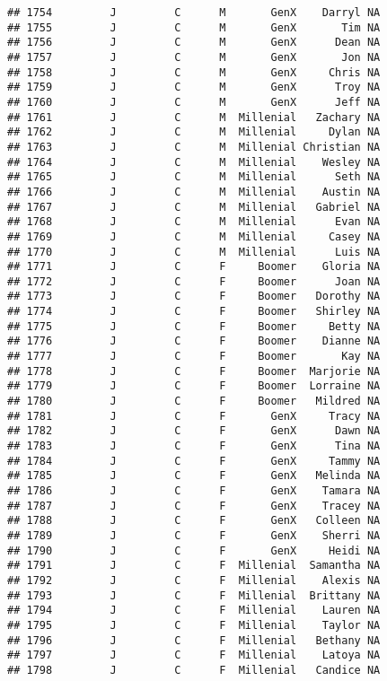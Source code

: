 \documentclass[
]{article}
\begin{document}
\begin{verbatim}
## 1754         J         C      M       GenX    Darryl NA
## 1755         J         C      M       GenX       Tim NA
## 1756         J         C      M       GenX      Dean NA
## 1757         J         C      M       GenX       Jon NA
## 1758         J         C      M       GenX     Chris NA
## 1759         J         C      M       GenX      Troy NA
## 1760         J         C      M       GenX      Jeff NA
## 1761         J         C      M  Millenial   Zachary NA
## 1762         J         C      M  Millenial     Dylan NA
## 1763         J         C      M  Millenial Christian NA
## 1764         J         C      M  Millenial    Wesley NA
## 1765         J         C      M  Millenial      Seth NA
## 1766         J         C      M  Millenial    Austin NA
## 1767         J         C      M  Millenial   Gabriel NA
## 1768         J         C      M  Millenial      Evan NA
## 1769         J         C      M  Millenial     Casey NA
## 1770         J         C      M  Millenial      Luis NA
## 1771         J         C      F     Boomer    Gloria NA
## 1772         J         C      F     Boomer      Joan NA
## 1773         J         C      F     Boomer   Dorothy NA
## 1774         J         C      F     Boomer   Shirley NA
## 1775         J         C      F     Boomer     Betty NA
## 1776         J         C      F     Boomer    Dianne NA
## 1777         J         C      F     Boomer       Kay NA
## 1778         J         C      F     Boomer  Marjorie NA
## 1779         J         C      F     Boomer  Lorraine NA
## 1780         J         C      F     Boomer   Mildred NA
## 1781         J         C      F       GenX     Tracy NA
## 1782         J         C      F       GenX      Dawn NA
## 1783         J         C      F       GenX      Tina NA
## 1784         J         C      F       GenX     Tammy NA
## 1785         J         C      F       GenX   Melinda NA
## 1786         J         C      F       GenX    Tamara NA
## 1787         J         C      F       GenX    Tracey NA
## 1788         J         C      F       GenX   Colleen NA
## 1789         J         C      F       GenX    Sherri NA
## 1790         J         C      F       GenX     Heidi NA
## 1791         J         C      F  Millenial  Samantha NA
## 1792         J         C      F  Millenial    Alexis NA
## 1793         J         C      F  Millenial  Brittany NA
## 1794         J         C      F  Millenial    Lauren NA
## 1795         J         C      F  Millenial    Taylor NA
## 1796         J         C      F  Millenial   Bethany NA
## 1797         J         C      F  Millenial    Latoya NA
## 1798         J         C      F  Millenial   Candice NA

\end{verbatim}
\end{document}

